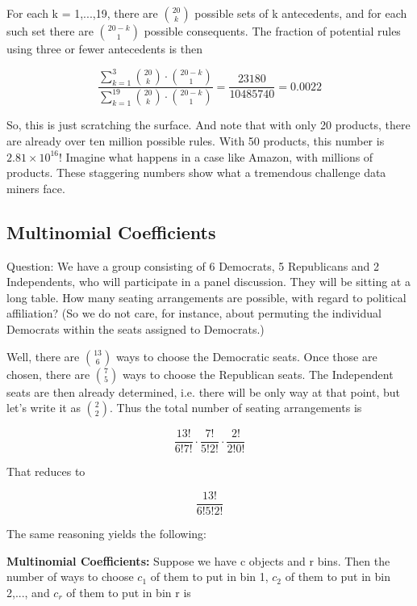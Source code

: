 For each k = 1,...,19, there are $\binom{20}{k}$ possible sets of k
antecedents, and for each such set there are $\binom{20-k}{1}$ possible
consequents.  The fraction of potential rules using three or fewer
antecedents is then

\begin{equation}
\frac
{\sum_{k=1}^{3} \binom{20}{k} \cdot \binom{20-k}{1}}
{\sum_{k=1}^{19} \binom{20}{k} \cdot \binom{20-k}{1}}
= \frac{23180}{10485740}
= 0.0022
\end{equation}

So, this is just scratching the surface.  And note that with only 20
products, there are already over ten million possible rules.  With 50
products, this number is $2.81 \times 10^{16}$!  Imagine what happens in
a case like Amazon, with millions of products.  These staggering numbers
show what a tremendous challenge data miners face.




\subsection{Multinomial Coefficients}
\label{multnomcoeff}

Question:  We have a group consisting of 6 Democrats, 5 Republicans and
2 Independents, who will participate in a panel discussion.  They will
be sitting at a long table.  How many seating arrangements are possible,
with regard to political affiliation?  (So we do not care, for instance,
about permuting the individual Democrats within the seats assigned to
Democrats.)

Well, there are $\binom{13}{6}$ ways to choose the Democratic seats.
Once those are chosen, there are $\binom{7}{5}$ ways to choose the
Republican seats.  The Independent seats are then already determined,
i.e. there will be only way at that point, but let's write it as
$\binom{2}{2}$.  Thus the total number of seating arrangements is

\begin{equation}
\frac{13!}{6!7!} \cdot
\frac{7!}{5!2!} \cdot
\frac{2!}{2!0!} 
\end{equation}

That reduces to

\begin{equation}
\frac{13!}{6!5!2!}
\end{equation}

The same reasoning yields the following:

{\bf Multinomial Coefficients:} Suppose we have c objects and r bins.
Then the number of ways to choose $c_1$ of them to put in bin 1, $c_2$
of them to put in bin 2,..., and $c_r$ of them to put in bin r is


